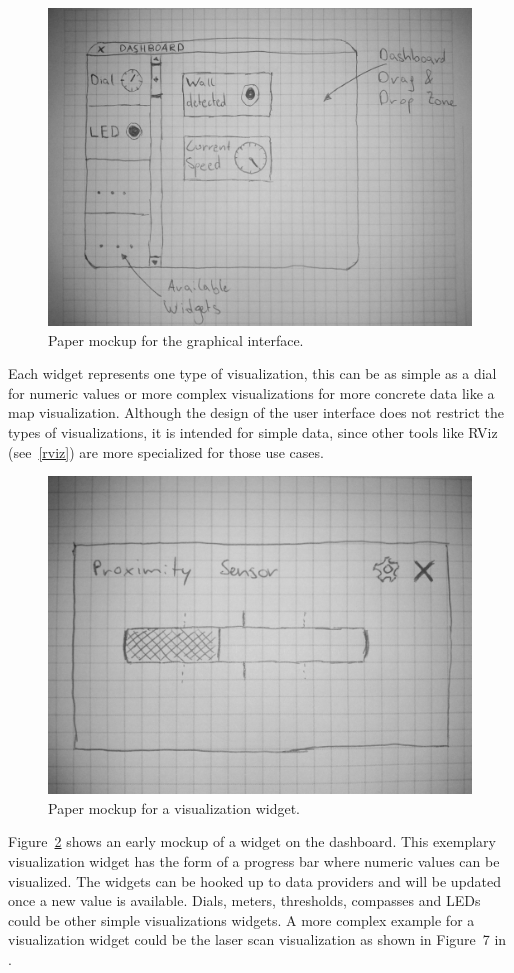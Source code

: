 \begin{figure}[htbp]
  \centering
  \includegraphics[width=\textwidth]{img/initial_gui_mockup.jpg}
  \caption{Paper mockup for the graphical interface.}
  \label{gui_mockup}
\end{figure}

Each widget represents one type of visualization, this can be as simple as a dial for numeric values or more complex visualizations for more concrete data like a map visualization. Although the design of the user interface does not restrict the types of visualizations, it is intended for simple data, since other tools like RViz (see~\ref{rviz}) are more specialized for those use cases.

\begin{figure}[htbp]
  \centering
  \includegraphics[width=.5\textwidth]{img/initial_widget_mockup.jpg}
  \caption{Paper mockup for a visualization widget.}
  \label{widget_mockup}
\end{figure}

Figure~\ref{widget_mockup} shows an early mockup of a widget on the dashboard. This exemplary visualization widget has the form of a progress bar where numeric values can be visualized. The widgets can be hooked up to data providers and will be updated once a new value is available. Dials, meters, thresholds, compasses and LEDs could be other simple visualizations widgets. A more complex example for a visualization widget could be the laser scan visualization as shown in Figure~7 in \cite{Gumbley2009}.

